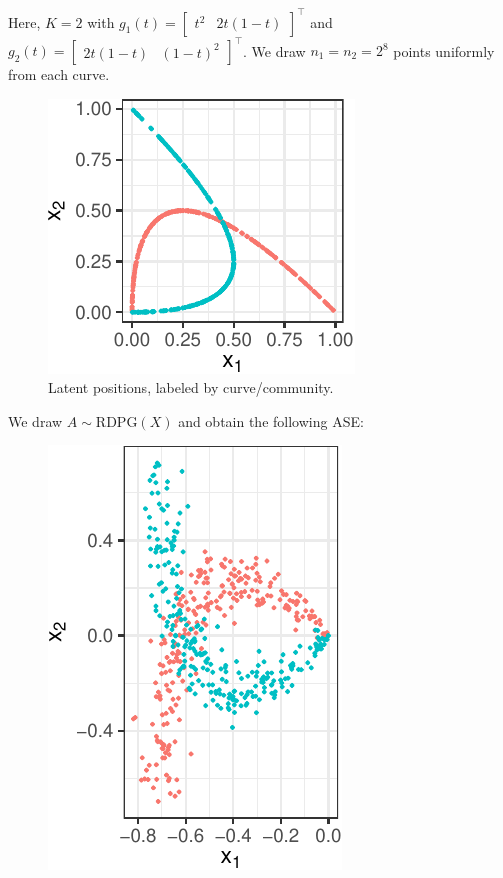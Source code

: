\documentclass[12pt]{article}
\begin{document}
\begin{example}
Here, $K = 2$ with $g_1(t) = \begin{bmatrix} t^2 & 2 t (1 - t) \end{bmatrix}^\top$ and $g_2(t) = \begin{bmatrix} 2 t (1 - t) & (1 - t) ^ 2 \end{bmatrix}^\top$. We draw $n_1 = n_2 = 2^8$ points uniformly from each curve. 

\begin{figure}[H]

{\centering \includegraphics{draft_files/figure-latex/unnamed-chunk-2-1} 

}

\caption{Latent positions, labeled by curve/community.}\label{fig:unnamed-chunk-2}
\end{figure}

We draw $A \sim \mathrm{RDPG}(X)$ and obtain the following ASE:

\begin{figure}[H]

{\centering \includegraphics{draft_files/figure-latex/unnamed-chunk-3-1} 

}
\end{figure}
\end{example}
\end{document}
